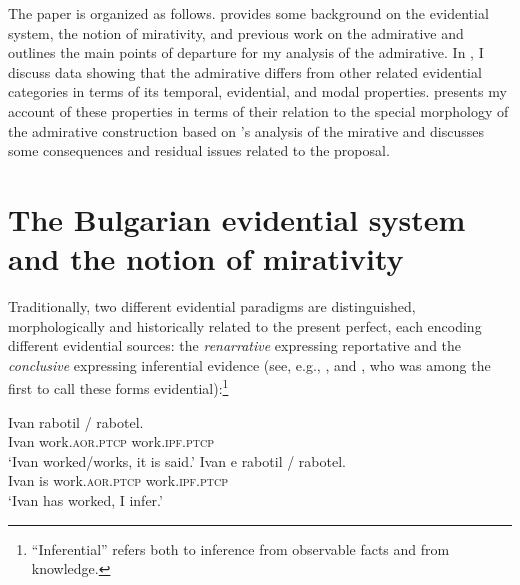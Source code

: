 \documentclass[output=paper]{langscibook}
\begin{document}
The paper is organized as follows.  provides some background on the  evidential system, the notion of mirativity, and previous work on the  admirative and outlines the main points of departure for my analysis of the admirative. In , I discuss data showing that the  admirative differs from other related evidential categories in terms of its temporal, evidential, and modal properties.  presents my account of these properties in terms of their relation to the special morphology of the admirative construction based on \citeauthor{Bustamante2013}'s analysis of the  mirative and  discusses some consequences and residual issues related to the proposal.




\section{The Bulgarian evidential system and the notion of mirativity}\label{sec:BG_evid_syst}

Traditionally, two different evidential paradigms are distinguished, morphologically and historically \citep[see][]{Andrejcin1944,Aronson1967}
related to the present perfect, each encoding different evidential sources: the \textit{renarrative} expressing reportative  and the \textit{conclusive} expressing inferential  evidence (see, e.g., \citealt{Bojadziev.etal1999,Pasov1999,Nicolova2008}, and \citealt{Jacobson1971}, who was among the first to call these forms evidential):\footnote{``Inferential'' refers both to inference from observable facts and from knowledge. %
}

\ea\label{report}
\gll Ivan rabotil / rabotel. \\
Ivan work.\textsc{aor.ptcp} {} work.\textsc{ipf.ptcp} \\
\glt `Ivan worked/works, it is said.'
\ex \label{concl}
\gll Ivan e rabotil / rabotel. \\
 Ivan is work.\textsc{aor.ptcp} {} work.\textsc{ipf.ptcp}\\
\glt `Ivan has worked, I infer.'
\z
\end{document}
